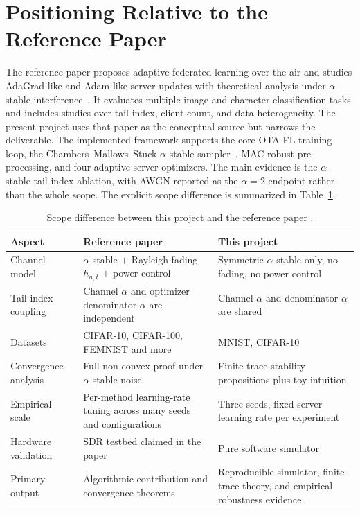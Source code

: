 \section{Positioning Relative to the Reference Paper}
The reference paper proposes adaptive federated learning over the
air and studies AdaGrad-like and Adam-like server updates with
theoretical analysis under $\alpha$-stable
interference~\cite{wang2024adaptive}. It evaluates multiple image and
character classification tasks and includes studies over tail index,
client count, and data heterogeneity. The present project uses that
paper as the conceptual source but narrows the deliverable. The
implemented framework supports the core OTA-FL training loop, the
Chambers--Mallows--Stuck $\alpha$-stable
sampler~\cite{chambers1976method}, MAC robust pre-processing, and
four adaptive server optimizers. The main evidence is the
$\alpha$-stable tail-index ablation, with AWGN reported as the
$\alpha=2$ endpoint rather than the whole scope. The explicit
scope difference is summarized in Table~\ref{tab:scope-diff}.

\begin{table}[!htbp]
    \centering
    \caption{Scope difference between this project and the reference paper
    \cite{wang2024adaptive}.}
    \label{tab:scope-diff}
    \begin{tabular}{p{}|p{}|p{}}
        \hline
        Aspect & Reference paper & This project \\
        \hline
        Channel model & $\alpha$-stable $+$ Rayleigh fading
        $h_{n,t}$ $+$ power control & Symmetric $\alpha$-stable only,
        no fading, no power control \\
        Tail index coupling & Channel $\alpha$ and optimizer
        denominator $\alpha$ are independent & Channel $\alpha$ and
        denominator $\alpha$ are shared \\
        Datasets & CIFAR-10, CIFAR-100, FEMNIST and more &
        MNIST, CIFAR-10 \\
        Convergence analysis & Full non-convex proof under
        $\alpha$-stable noise & Finite-trace stability propositions
        plus toy intuition
        \\
        Empirical scale & Per-method learning-rate tuning across many
        seeds and configurations & Three seeds, fixed server
        learning rate per experiment \\
        Hardware validation & SDR testbed claimed in the paper &
        Pure software simulator \\
        Primary output & Algorithmic contribution and convergence
        theorems & Reproducible simulator, finite-trace theory, and
        empirical robustness evidence \\
        \hline
    \end{tabular}
\end{table}
